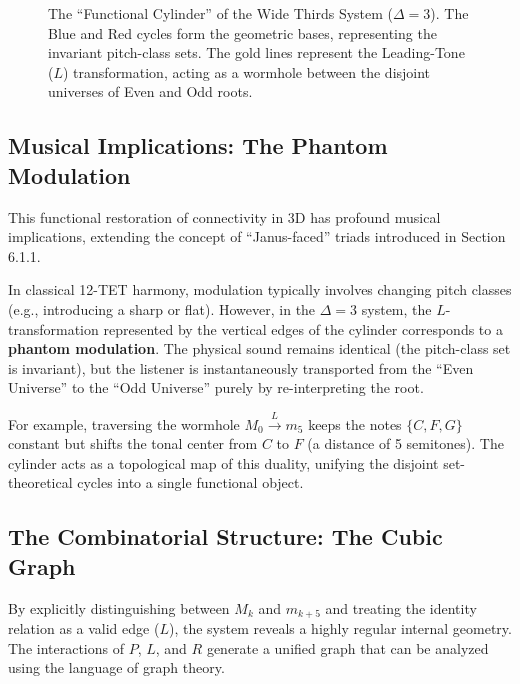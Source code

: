 \documentclass[12pt,letterpaper]{amsart}
\begin{document}
\begin{figure}[H]
\caption{\scriptsize The ``Functional Cylinder'' of the Wide Thirds System ($\Delta=3$). The Blue and Red cycles form the geometric bases, representing the invariant pitch-class sets. The gold lines represent the Leading-Tone ($L$) transformation, acting as a wormhole between the disjoint universes of Even and Odd roots.}
\label{fig:cylinder_delta3}
\end{figure}

\subsection{Musical Implications: The Phantom Modulation}

This functional restoration of connectivity in 3D has profound musical implications, extending the concept of ``Janus-faced'' triads introduced in Section 6.1.1.

In classical 12-TET harmony, modulation typically involves changing pitch classes (e.g., introducing a sharp or flat). However, in the $\Delta=3$ system, the $L$-transformation represented by the vertical edges of the cylinder corresponds to a \textbf{phantom modulation}. The physical sound remains identical (the pitch-class set is invariant), but the listener is instantaneously transported from the ``Even Universe'' to the ``Odd Universe'' purely by re-interpreting the root.

For example, traversing the wormhole $M_0 \xrightarrow{L} m_5$ keeps the notes $\{C, F, G\}$ constant but shifts the tonal center from $C$ to $F$ (a distance of 5 semitones). The cylinder acts as a topological map of this duality, unifying the disjoint set-theoretical cycles into a single functional object.

\subsection{The Combinatorial Structure: The Cubic Graph}
\label{sec:restored_cubic}

By explicitly distinguishing between $M_k$ and $m_{k+5}$ and treating the identity relation as a valid edge ($L$), the system reveals a highly regular internal geometry. The interactions of $P$, $L$, and $R$ generate a unified graph that can be analyzed using the language of graph theory.
\end{document}
